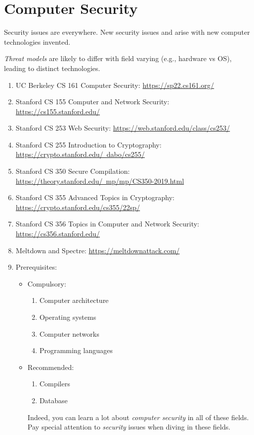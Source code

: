 \documentclass{article}
\begin{document}
\section{Computer Security}
Security issues are everywhere.
New security issues and arise with new computer technologies invented.

\emph{Threat models} are likely to differ with field varying (e.g., hardware vs OS), leading to distinct technologies.
\begin{enumerate}
    \item UC Berkeley CS 161 Computer Security:
    \href{https://sp22.cs161.org/}{https://sp22.cs161.org/}
    \item Stanford CS 155 Computer and Network Security:
    \href{https://cs155.stanford.edu/}{https://cs155.stanford.edu/}
    \item Stanford CS 253 Web Security:
    \href{https://web.stanford.edu/class/cs253/}{https://web.stanford.edu/class/cs253/}
    \item Stanford CS 255 Introduction to Cryptography:
    \href{https://crypto.stanford.edu/~dabo/cs255/}{https://crypto.stanford.edu/~dabo/cs255/}
    \item Stanford CS 350 Secure Compilation:\\
    \href{https://theory.stanford.edu/~mp/mp/CS350-2019.html}{https://theory.stanford.edu/~mp/mp/CS350-2019.html}
    \item Stanford CS 355 Advanced Topics in Cryptography:\\
    \href{https://crypto.stanford.edu/cs355/22sp/}{https://crypto.stanford.edu/cs355/22sp/}
    \item Stanford CS 356 Topics in Computer and Network Security:
    \href{https://cs356.stanford.edu/}{https://cs356.stanford.edu/}
    \item Meltdown and Spectre:
    \href{https://meltdownattack.com/}{https://meltdownattack.com/}
    \item Prerequisites:
    \begin{itemize}
        \item Compulsory:
        \begin{enumerate}
            \item Computer architecture
            \item Operating systems
            \item Computer networks
            \item Programming languages
        \end{enumerate}
        \item Recommended:
        \begin{enumerate}
            \item Compilers
            \item Database
        \end{enumerate}
        Indeed, you can learn a lot about \emph{computer security} in all of these fields.
        Pay special attention to \emph{security} issues when diving in these fields.
    \end{itemize}
\end{enumerate}
\end{document}
